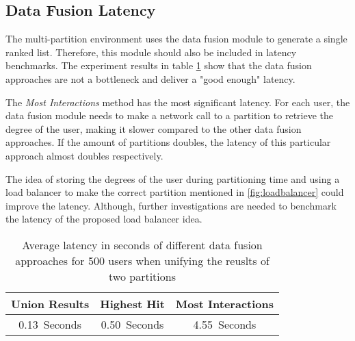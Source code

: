 \subsection{Data Fusion Latency}
\label{subsec:data-fusion-latency}
The multi-partition environment uses the data fusion module to generate a single ranked list. Therefore, this module should also be included in latency benchmarks. The experiment results in table \ref{tab:data-fusion-latency} show that the data fusion approaches are not a bottleneck and deliver a "good enough" latency.


The \emph{Most Interactions} method has the most significant latency. For each user, the data fusion module needs to make a network call to a partition to retrieve the degree of the user, making it slower compared to the other data fusion approaches. If the amount of partitions doubles, the latency of this particular approach almost doubles respectively.


The idea of storing the degrees of the user during partitioning time and using a load balancer to make the correct partition mentioned in \ref{fig:loadbalancer} could improve the latency. Although, further investigations are needed to benchmark the latency of the proposed load balancer idea.


\begin{table}[!htb]
    \centering
    \caption{Average latency in seconds of different data fusion approaches for 500 users when unifying the reuslts of two partitions}
    \label{tab:data-fusion-latency}
    \begin{tabular}{|c|c|c|}
        \hline
        \textbf{Union Results} & \textbf{Highest Hit} & \textbf{Most Interactions} \\
        \hline
        0.13~Seconds & 0.50~Seconds & 4.55~Seconds \\
        \hline
    \end{tabular}
\end{table}
